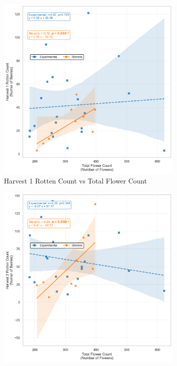 \begin{figure}[!ht]
  \begin{subfigure}{0.5\textwidth}
    \includegraphics[width=\textwidth]{images/H1 RC vs TFC.png}
   \caption{Harvest 1 Rotten Count vs Total Flower Count}
    \label{fig:H1 RC vs TFC}
  \end{subfigure}
  \hfill
  \begin{subfigure}{0.5\textwidth}
    \includegraphics[width=\textwidth]{images/H2 RC vs TFC.png}

\end{subfigure}
\end{figure}
